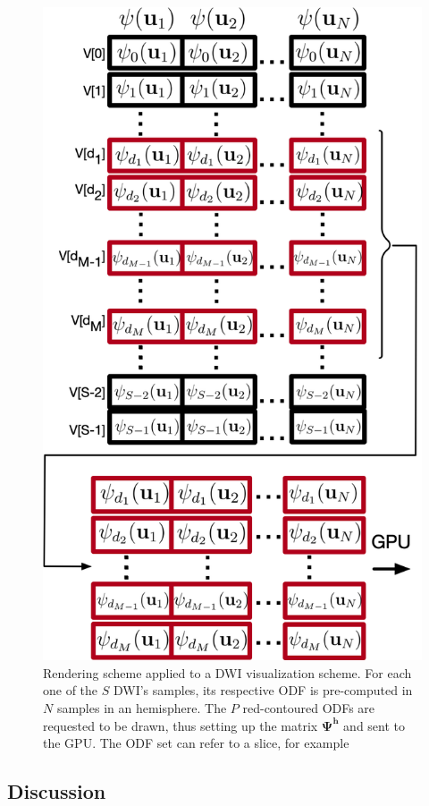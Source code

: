 \documentclass[twoside,twocolumn,10pt]{article}
\begin{document}
\begin{figure}[h]
    \centering
    \includegraphics[width=0.89\linewidth, angle=0]{figs/rendering_scheme/organizacao2GPU_red1.png}
    \caption{Rendering scheme applied to a DWI visualization scheme. For each one of the $S$ DWI's samples, its respective ODF is pre-computed in $N$ samples in an hemisphere. The $P$ red-contoured ODFs are requested to be drawn, thus setting up the matrix $\bm{\Psi^{h}}$ and sent to the GPU. The ODF set can refer to a slice, for example}
    \label{fig::vmtk_precomputed2GPU}
\end{figure}



\subsection{Discussion}
\end{document}
